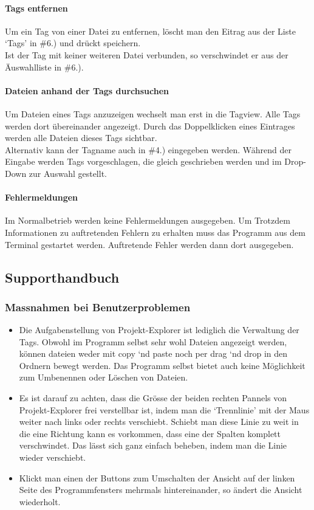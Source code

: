 \documentclass[10pt,paper=a4,final]{scrartcl}
\begin{document}
\paragraph{Tags entfernen}
Um ein Tag von einer Datei zu entfernen, l\"oscht man den Eitrag aus der Liste ‘Tags’ in \#6.) und dr\"uckt speichern.\\
Ist der Tag mit keiner weiteren Datei verbunden, so verschwindet er aus der \"Auswahlliste in \#6.).
\paragraph{Dateien anhand der Tags durchsuchen}
Um Dateien eines Tags anzuzeigen wechselt man erst in die Tagview. Alle Tags werden dort \"ubereinander angezeigt. Durch das Doppelklicken eines Eintrages werden alle Dateien dieses Tags sichtbar.\\
Alternativ kann der Tagname auch in \#4.) eingegeben werden. W\"ahrend der Eingabe werden Tags vorgeschlagen, die gleich geschrieben werden und im Drop-Down zur Auswahl gestellt.
\paragraph{Fehlermeldungen}
Im Normalbetrieb werden keine Fehlermeldungen ausgegeben. Um Trotzdem Informationen zu auftretenden Fehlern zu erhalten muss das Programm aus dem Terminal gestartet werden. Auftretende Fehler werden dann dort ausgegeben.
\subsection{Supporthandbuch}
\subsubsection{Massnahmen bei Benutzerproblemen}
\begin{itemize}
  \item Die Aufgabenstellung von Projekt-Explorer ist lediglich die Verwaltung der Tags. Obwohl im Programm selbst sehr wohl Dateien angezeigt werden, k\"onnen dateien weder mit copy ‘nd paste noch per drag ‘nd drop in den Ordnern bewegt werden. Das Programm selbst bietet auch keine M\"oglichkeit zum Umbenennen oder L\"oschen von Dateien.
  \item Es ist darauf zu achten, dass die Gr\"osse der beiden rechten Pannels von Projekt-Explorer frei verstellbar ist, indem man die ‘Trennlinie’ mit der Maus weiter nach links oder rechts verschiebt. Schiebt man diese Linie zu weit in die eine Richtung kann es vorkommen, dass eine der Spalten komplett verschwindet. Das l\"asst sich ganz einfach beheben, indem man die Linie wieder verschiebt.
  \item Klickt man einen der Buttons zum Umschalten der Ansicht auf der linken Seite des Programmfensters mehrmals hintereinander, so \"andert die Ansicht wiederholt.
\end{itemize}
\end{document}
